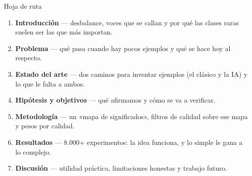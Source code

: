 \begin{frame}{Hoja de ruta}
\small
{}
\begin{enumerate}\setlength\itemsep{4pt}
  \item \textbf{Introducción} — desbalance, voces que se callan y por qué las clases raras suelen ser las que más importan.

  \item \textbf{Problema} — qué pasa cuando hay pocos ejemplos y qué se hace hoy al respecto.

  \item \textbf{Estado del arte} — dos caminos para inventar ejemplos (el clásico y la IA) y lo que le falta a ambos.

  \item \textbf{Hipótesis y objetivos} — qué afirmamos y cómo se va a verificar.

  \item \textbf{Metodología} — un «mapa de significados», filtros de calidad sobre ese mapa y pesos por calidad.

  \item \textbf{Resultados} — \alert{8.000+ experimentos}: la idea funciona, y lo simple le gana a lo complejo.

  \item \textbf{Discusión} — utilidad práctica, limitaciones honestas y trabajo futuro.
\end{enumerate}
\end{frame}
